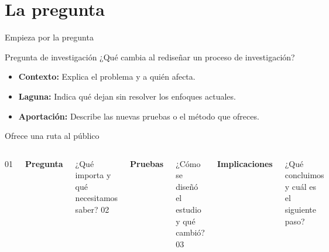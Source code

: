 \section{La pregunta}
\begin{frame}{Empieza por la pregunta}
\begin{block}{Pregunta de investigación}
¿Qué cambia al rediseñar un proceso de investigación?
\end{block}
\vspace{4mm}
\begin{itemize}\setlength{\itemsep}{5mm}
\item \textbf{Contexto:} Explica el problema y a quién afecta.
\item \textbf{Laguna:} Indica qué dejan sin resolver los enfoques actuales.
\item \textbf{Aportación:} Describe las nuevas pruebas o el método que ofreces.
\end{itemize}
\end{frame}

\begin{frame}{Ofrece una ruta al público}
\begin{columns}[T,onlytextwidth]
{\Huge\color{accent}01}\par\vspace{3mm}
\textbf{Pregunta}\par\vspace{2mm}
¿Qué importa y qué necesitamos saber?
{\Huge\color{accent}02}\par\vspace{3mm}
\textbf{Pruebas}\par\vspace{2mm}
¿Cómo se diseñó el estudio y qué cambió?
{\Huge\color{accent}03}\par\vspace{3mm}
\textbf{Implicaciones}\par\vspace{2mm}
¿Qué concluimos y cuál es el siguiente paso?
\end{columns}
\end{frame}
